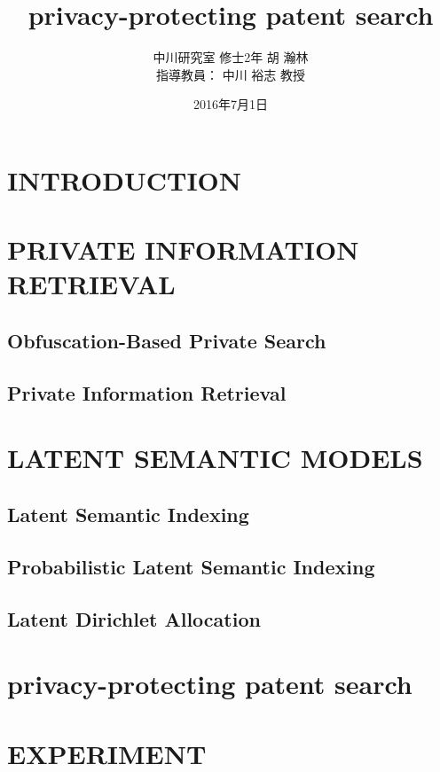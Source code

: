 \documentclass{jsarticle}
\title{privacy-protecting patent search}
\author{中川研究室 修士2年 胡 瀚林\\指導教員： 中川 裕志 教授}
\date{2016年7月1日}
\theoremstyle{definition}
\begin{document}
\maketitle
\begin{abstract}
\end{abstract}


\section{INTRODUCTION}
\section{PRIVATE INFORMATION RETRIEVAL}
\subsection{Obfuscation-Based Private Search}
\subsection{Private Information Retrieval}
\section{LATENT SEMANTIC MODELS}
\subsection{Latent Semantic Indexing}
\subsection{Probabilistic Latent Semantic Indexing}
\subsection{Latent Dirichlet Allocation}
\section{privacy-protecting patent search}
\section{EXPERIMENT}
\end{document}
